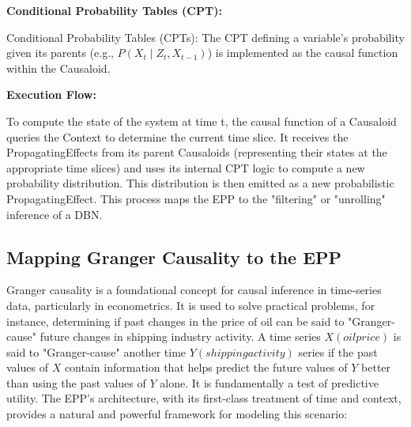 \textbf{Conditional Probability Tables (CPT):}

Conditional Probability Tables (CPTs): The CPT defining a variable's probability given its parents
(e.g., $P(X_t \mid Z_t, X_{t-1})$) is implemented as the causal function within the Causaloid.


\textbf{Execution Flow:}

To compute the state of the system at time t, the causal function of a Causaloid queries the Context to determine the current time slice. It receives the PropagatingEffects from its parent Causaloids (representing their states at the appropriate time slices) and uses its internal CPT logic to compute a new probability distribution. This distribution is then emitted as a new probabilistic PropagatingEffect. This process maps the EPP to the "filtering" or "unrolling" inference of a DBN.
%
%
\subsection{Mapping Granger Causality to the EPP}
\label{sec:epp_Granger_Causality}

Granger causality is a foundational concept for causal inference in time-series data, particularly in econometrics. It is used to solve practical problems, for instance, determining if past changes in the price of oil can be said to "Granger-cause" future changes in shipping industry activity. 
A time series $X(oil price)$ is said to "Granger-cause" another time $Y(shipping activity)$ series if the past values of  $X$ contain information that helps predict the future values of $Y$ 
 better than using the past values of $Y$ alone. It is fundamentally a test of predictive utility. The EPP's architecture, with its first-class treatment of time and context, provides a natural and powerful framework for modeling this scenario:

